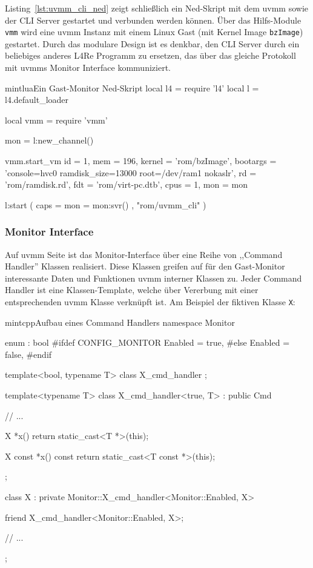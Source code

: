 Listing~\ref{lst:uvmm_cli_ned} zeigt schließlich ein Ned-Skript mit dem uvmm
sowie der CLI Server gestartet und verbunden werden können. Über das
Hilfs-Module \texttt{vmm} wird eine uvmm Instanz mit einem Linux Gast (mit
Kernel Image \texttt{bzImage}) gestartet. Durch das modulare Design ist es
denkbar, den CLI Server durch ein beliebiges anderes L4Re Programm zu ersetzen,
das über das gleiche Protokoll mit uvmms Monitor Interface kommuniziert.

\begin{mintlisting}[label=lst:uvmm_cli_ned]{mintlua}{Ein Gast-Monitor Ned-Skript}
local l4 = require 'l4'
local l = l4.default_loader

local vmm = require 'vmm'

mon = l:new_channel()

vmm.start_vm
  {
    id       = 1,
    mem      = 196,
    kernel   = 'rom/bzImage',
    bootargs = 'console=hvc0 ramdisk_size=13000 root=/dev/ram1 nokaslr',
    rd       = 'rom/ramdisk.rd',
    fdt      = 'rom/virt-pc.dtb',
    cpus     = 1,
    mon      = mon
  }

l:start
  (
    { caps = { mon = mon:svr() } },
    "rom/uvmm_cli"
  )
\end{mintlisting}

\subsubsection{Monitor Interface}

Auf uvmm Seite ist das Monitor-Interface über eine Reihe von ,,Command
Handler'' Klassen realisiert. Diese Klassen greifen auf für den Gast-Monitor
interessante Daten und Funktionen uvmm interner Klassen zu. Jeder Command
Handler ist eine Klassen-Template, welche über Vererbung mit einer
entsprechenden uvmm Klasse verknüpft ist. Am Beispiel der fiktiven Klasse
\texttt{X}:

\begin{mintlisting}{mintcpp}{Aufbau eines Command Handlers}
namespace Monitor {

enum : bool {
#ifdef CONFIG_MONITOR
  Enabled = true,
#else
  Enabled = false,
#endif
}

template<bool, typename T>
class X_cmd_handler {};

template<typename T>
class X_cmd_handler<true, T> : public Cmd
{
  // ...

  X *x()
  { return static_cast<T *>(this); }

  X const *x() const
  { return static_cast<T const *>(this); }
};

}

class X : private Monitor::X_cmd_handler<Monitor::Enabled, X>
{
  friend X_cmd_handler<Monitor::Enabled, X>;

  // ...
};
\end{mintlisting}

